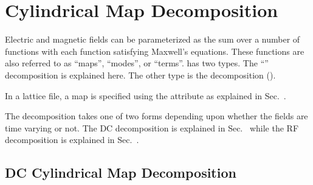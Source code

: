 \section{Cylindrical Map Decomposition}
\label{s:cylind.map.phys}

Electric and magnetic fields can be parameterized as the sum over a number of functions
with each function satisfying Maxwell's equations. These functions are also referred to as
``maps'', ``modes'', or ``terms''. \bmad has two types. The ``''
decomposition is explained here. The other type is the  decomposition
().

In a lattice file, a  map is specified using the 
attribute as explained in Sec.~.

The  decomposition takes one of two forms depending upon whether the
fields are time varying or not. The DC decomposition is explained in
Sec.~ while the RF decomposition is explained in
Sec.~. 

\subsection{DC Cylindrical Map Decomposition}
\label{s:cylind.dc}

